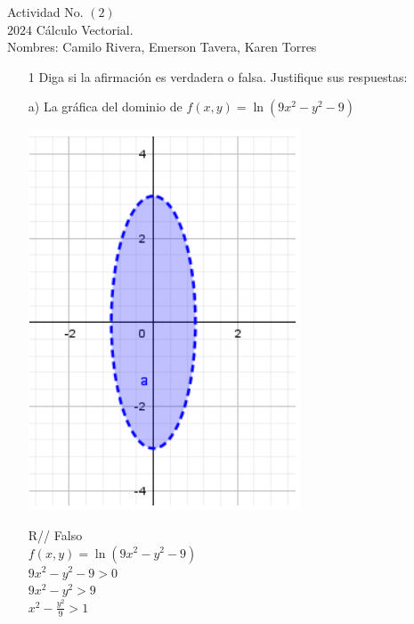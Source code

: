 \documentclass[13pt]{memoir}
\begin{document}
\begin{center}
			\centering
			Actividad No. $(2)$\\
			$2024$ Cálculo Vectorial.\\
			Nombres:  Camilo Rivera, Emerson Tavera, Karen Torres
\end{center}

\begin{enumerate}

\item[ 1] Diga si la afirmación es verdadera o falsa. Justifique sus respuestas: 
	
	
	
	\item[ a)] La gráfica del dominio de $f(x, y) = \ln(9x^2 - y^2 - 9)$ \\
	\begin{center}
	\includegraphics[scale=1]{assets/t_2_1.png} 
	\end{center}
	
	R// Falso\\
	 $f(x, y) = \ln(9x^2 - y^2 - 9)$ \\
	$9x^2 - y^2 - 9 > 0$\\
	$9x^2 - y^2 > 9$\\
	$x^2 - \frac{y^2}{9} > 1$\\ 
	

\end{enumerate}
\end{document}
